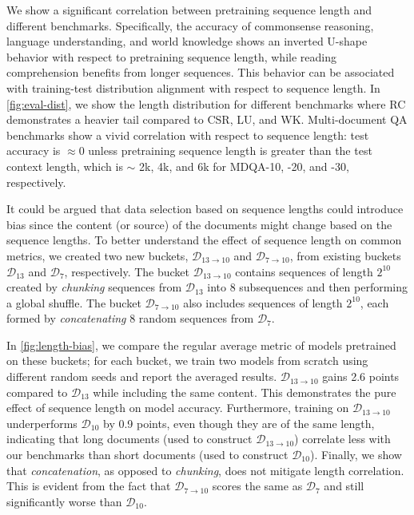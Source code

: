 We show a significant correlation between pretraining sequence length and different benchmarks. Specifically, the accuracy of commonsense reasoning, language understanding, and world knowledge shows an inverted U-shape behavior with respect to pretraining sequence length, while reading comprehension benefits from longer sequences. This behavior can be associated with training-test distribution alignment with respect to sequence length. In \cref{fig:eval-dist}, we show the length distribution for different benchmarks where RC demonstrates a heavier tail compared to CSR, LU, and WK. Multi-document QA benchmarks show a vivid correlation with respect to sequence length: test accuracy is $\approx0$ unless pretraining sequence length is greater than the test context length, which is $\sim$ 2k, 4k, and 6k for MDQA-10, -20, and -30, respectively.
 

It could be argued that data selection based on sequence lengths could introduce bias since the content (or source) of the documents might change based on the sequence lengths. To better understand the effect of sequence length on common metrics, we created two new buckets, $\mathcal{D}_{13\to10}$ and $\mathcal{D}_{7\to10}$, from existing buckets $\mathcal{D}_{13}$ and $\mathcal{D}_{7}$, respectively. The bucket $\mathcal{D}_{13\to10}$ contains sequences of length $2^{10}$ created by \emph{chunking} sequences from $\mathcal{D}_{13}$ into 8 subsequences and then performing a global shuffle. The bucket $\mathcal{D}_{7\to10}$ also includes sequences of length $2^{10}$, each formed by \emph{concatenating} 8 random sequences from $\mathcal{D}_7$. 

In \cref{fig:length-bias}, we compare the regular average metric of models pretrained on these buckets; for each bucket, we train two models from scratch using different random seeds and report the averaged results. $\mathcal{D}_{13\to10}$ gains 2.6 points compared to $\mathcal{D}_{13}$ while including the same content. This demonstrates the pure effect of sequence length on model accuracy. Furthermore, training on $\mathcal{D}_{13\to10}$ underperforms $\mathcal{D}_{10}$ by 0.9 points, even though they are of the same length, indicating that long documents (used to construct $\mathcal{D}_{13\to10}$) correlate less with our benchmarks than short documents (used to construct $\mathcal{D}_{10}$). Finally, we show that \emph{concatenation}, as opposed to \emph{chunking}, does not mitigate length correlation. This is evident from the fact that $\mathcal{D}_{7\to10}$ scores the same as $\mathcal{D}_7$ and still significantly worse than $\mathcal{D}_{10}$.

